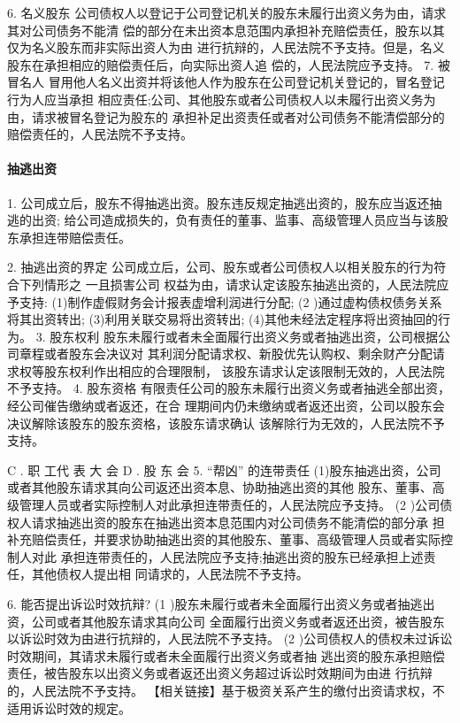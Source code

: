 \documentclass[UTF8,12pt]{ctexart}
\numberwithin{equation}{section} %
\numberwithin{figure}{section}
\numberwithin{table}{section}
\begin{document}
	6. 名义股东 公司债权人以登记于公司登记机关的股东未履行出资义务为由，请求其对公司债务不能清 偿的部分在未出资本息范围内承担补充赔偿责任，股东以其仅为名义股东而非实际出资人为由 进行抗辩的，人民法院不予支持。但是，名义股东在承担相应的赔偿责任后，向实际出资人追 偿的，人民法院应予支持。
	7. 被冒名人 冒用他人名义出资并将该他人作为股东在公司登记机关登记的，冒名登记行为人应当承担 相应责任;公司、其他股东或者公司债权人以未履行出资义务为由，请求被冒名登记为股东的 承担补足出资责任或者对公司债务不能清偿部分的赔偿责任的，人民法院不予支持。
	
	\paragraph{抽逃出资}
	1. 公司成立后，股东不得抽逃出资。股东违反规定抽逃出资的，股东应当返还抽逃的出资; 给公司造成损失的，负有责任的董事、监事、高级管理人员应当与该股东承担连带赔偿责任。
	
	2. 抽逃出资的界定 公司成立后，公司、股东或者公司债权人以相关股东的行为符合下列情形之 一且损害公司 权益为由，请求认定该股东抽逃出资的，人民法院应予支持: (1)制作虚假财务会计报表虚增利润进行分配;
	(2 )通过虚构债权债务关系将其出资转出;
	(3)利用关联交易将出资转出;
	(4)其他未经法定程序将出资抽回的行为。
	3. 股东权利 股东未履行或者未全面履行出资义务或者抽逃出资，公司根据公司章程或者股东会决议对 其利润分配请求权、新股优先认购权、剩余财产分配请求权等股东权利作出相应的合理限制， 该股东请求认定该限制无效的，人民法院不予支持。
	4. 股东资格 有限责任公司的股东未履行出资义务或者抽逃全部出资，经公司催告缴纳或者返还，在合 理期间内仍未缴纳或者返还出资，公司以股东会决议解除该股东的股东资格，该股东请求确认 该解除行为无效的，人民法院不予支持。
	
	C . 职 工代 表 大 会 D . 股 东 会
	5. “帮凶” 的连带责任
	(1)股东抽逃出资，公司或者其他股东请求其向公司返还出资本息、协助抽逃出资的其他 股东、董事、高级管理人员或者实际控制人对此承担连带责任的，人民法院应予支持。
	(2 )公司债权人请求抽逃出资的股东在抽逃出资本息范围内对公司债务不能清偿的部分承 担补充赔偿责任，并要求协助抽逃出资的其他股东、董事、高级管理人员或者实际控制人对此 承担连带责任的，人民法院应予支持;抽逃出资的股东已经承担上述责任，其他债权人提出相 同请求的，人民法院不予支持。
	
	6. 能否提出诉讼时效抗辩?
	(1 )股东未履行或者未全面履行出资义务或者抽逃出资，公司或者其他股东请求其向公司 全面履行出资义务或者返还出资，被告股东以诉讼时效为由进行抗辩的，人民法院不予支持。 (2 )公司债权人的债权未过诉讼时效期间，其请求未履行或者未全面履行出资义务或者抽 逃出资的股东承担赔偿责任，被告股东以出资义务或者返还出资义务超过诉讼时效期间为由进 行抗辩的，人民法院不予支持。 【相关链接】基于极资关系产生的缴付出资请求权，不适用诉讼时效的规定。
	
\end{document}
